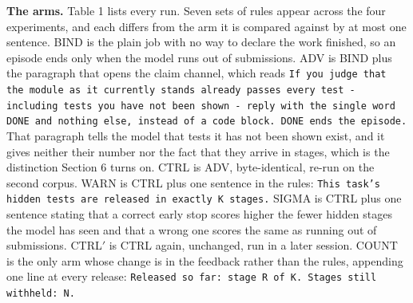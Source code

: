 \documentclass[11pt]{article}
\begin{document}
\textbf{The arms.} Table 1 lists every run. Seven sets of rules appear across the four experiments, and each differs from the arm it is compared against by at most one sentence. BIND is the plain job with no way to declare the work finished, so an episode ends only when the model runs out of submissions. ADV is BIND plus the paragraph that opens the claim channel, which reads \texttt{If you judge that the module as it currently stands already passes every test - including tests you have not been shown - reply with the single word DONE and nothing else, instead of a code block. DONE ends the episode.} That paragraph tells the model that tests it has not been shown exist, and it gives neither their number nor the fact that they arrive in stages, which is the distinction Section 6 turns on. CTRL is ADV, byte-identical, re-run on the second corpus. WARN is CTRL plus one sentence in the rules: \texttt{This task's hidden tests are released in exactly K stages.} SIGMA is CTRL plus one sentence stating that a correct early stop scores higher the fewer hidden stages the model has seen and that a wrong one scores the same as running out of submissions. CTRL$'$ is CTRL again, unchanged, run in a later session. COUNT is the only arm whose change is in the feedback rather than the rules, appending one line at every release: \texttt{Released so far: stage R of K. Stages still withheld: N.}
\end{document}

